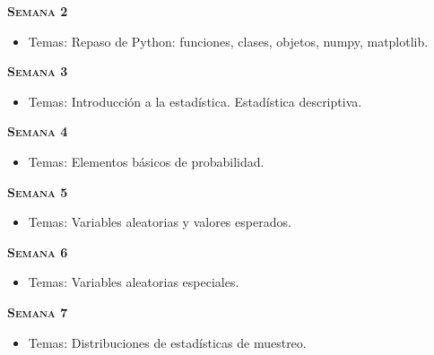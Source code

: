 \documentclass[letterpaper,10pt,onecolumn]{article}
\begin{document}
\noindent\textbf{\textsc{Semana 2}} \\[-0.5cm]
\begin{itemize}
\item Temas: 
Repaso de Python: funciones, clases, objetos, numpy, matplotlib. \\[-0.6cm] 
\end{itemize}

\noindent\textbf{\textsc{Semana 3}}\\[-0.5cm]
\begin{itemize}
\item Temas:  
Introducci\'on a la estad\'istica. Estad\'istica descriptiva.
\\[-0.6cm]  
\end{itemize}

\noindent\textbf{\textsc{Semana 4}}\\[-0.5cm]
\begin{itemize}
\item Temas:  Elementos b\'asicos de probabilidad. 
\\[-0.6cm] 
\end{itemize}

\noindent\textbf{\textsc{Semana 5}}\\[-0.5cm]
\begin{itemize}
\item Temas: Variables aleatorias y valores esperados.
  \\[-0.6cm] 
\end{itemize}


\noindent\textbf{\textsc{Semana 6}}\\[-0.5cm]
\begin{itemize}
\item Temas:  Variables aleatorias especiales. \\[-0.6cm]  
\end{itemize}


\noindent\textbf{\textsc{Semana 7}}\\[-0.5cm]
\begin{itemize}
\item Temas: Distribuciones de estad\'isticas de muestreo.
\\[-0.6cm] 
\end{itemize}
\end{document}
